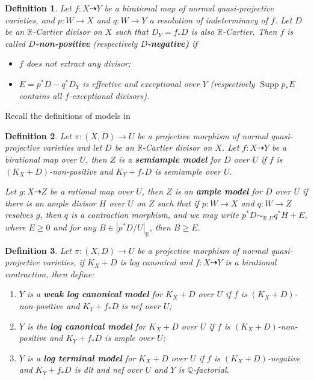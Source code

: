 \documentclass[11pt]{amsart}
\newtheorem{defn}{Definition}[section]
\begin{document}
\begin{defn}\label{negativemap}
  \cite[Definition 3.6.1]{BCHM10} Let $f:X\dashrightarrow Y$ be a birational map of normal quasi-projective varieties, and $p:W\to X$ and $q:W\to Y$  a resolution of indeterminacy of $f$. Let $D$ be an $\mathbb{R}$-Cartier divisor on $X$ such that  $D_{Y}=f_*D$ is  also $\mathbb{R}$-Cartier. Then $f$ is called \textbf{$D$-non-positive} (respectively \textbf{$D$-negative)} if
  \begin{itemize}
    \item $f$ does not extract any divisor;
    \item $E=p^{*}D-q^*D_Y$ is effective and exceptional over $Y$ (respectively $\operatorname{Supp}p_*E$ contains all $f$-exceptional divisors).
  \end{itemize}
\end{defn}

Recall the definitions of models in \cite{BCHM10}
\begin{defn}
  \cite[Definition 3.6.5]{BCHM10} Let $ \pi:(X,D)\to U $ be a projective morphism of normal quasi-projective varieties and let $D$ be an $\mathbb{R}$-Cartier divisor on $X$. Let $ f: X\dashrightarrow Y $ be a birational map over $ U $, then $ Z $ is a \textbf{semiample model } for $ D $ over $ U $ if $ f $ is $ (K_X+D) $-non-positive and $ K_Y+f_*D $ is semiample over $ U $.

  Let $ g:X\dashrightarrow Z $ be a rational map over $ U $, then $ Z $ is an \textbf{ample model } for $ D $ over $ U $ if there is  an ample divisor $H$  over $U$  on $Z$  such that if $p:W \to X $ and $q:W \to Z $ resolves $g$, then $q$ is a contraction morphism, and we may write $p^*D \sim_{\mathbb{R},U} q^*H+E$, where $E\geqslant 0$ and for any $B \in |p^*D/U|_{\mathbb{R}}$, then $B\geqslant E$.
\end{defn}
\begin{defn}\label{models}
  \cite[Definition 3.6.7]{BCHM10} Let $ \pi:(X,D)\to U $ be a projective morphism of normal quasi-projective varieties, if $ K_X+D $ is log canonical and $ f:X\dashrightarrow Y $ is a birational contraction, then define:
  \begin{enumerate}
    \item $ Y $ is a \textbf{weak log canonical model} for $ K_X+D $ over $ U $ if $ f $ is $ (K_X+D) $-non-positive and $ K_Y+f_*D $ is nef over $ U $;
    \item $ Y $ is the \textbf{log canonical model} for $ K_X+D $ over $ U $ if $ f $ is $ (K_X+D) $-non-positive and $ K_Y+f_*D $ is ample over $ U $;
    \item $ Y $ is  a \textbf{log terminal model} for $ K_X+D $ over $ U $ if $ f $ is $ (K_X+D)$-negative and $ K_Y+f_*D $ is dlt and nef over $ U $ and $ Y $ is $ \mathbb{Q} $-factorial.
  \end{enumerate}
\end{defn}
\end{document}
